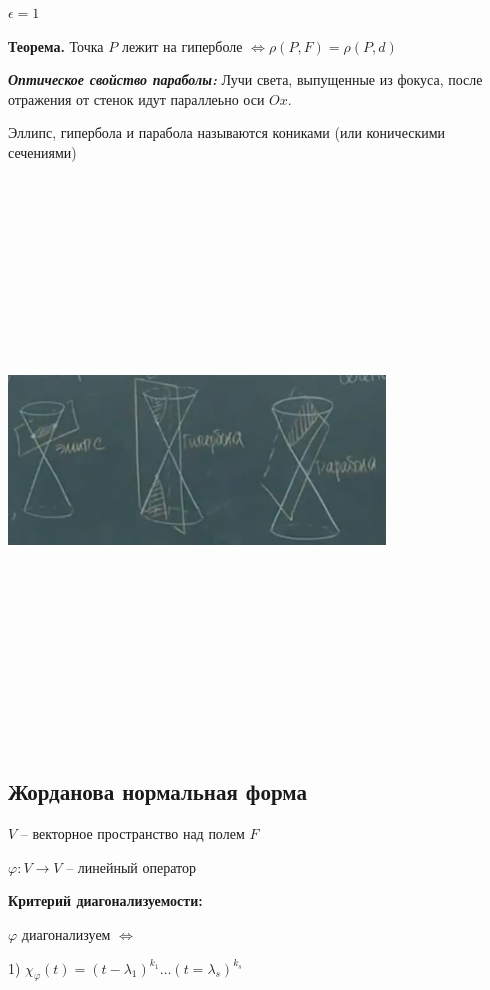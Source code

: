 $\epsilon = 1$

\bigskip
\textbf{Теорема.} Точка $P$ лежит на гиперболе $\Leftrightarrow \rho(P, F) = \rho(P, d)$

\bigskip
\textbf{\textit{Оптическое свойство параболы:}} Лучи света, выпущенные из фокуса, после отражения от стенок идут параллеьно оси $Ox$.

\bigskip
Эллипс, гипербола и парабола называются кониками (или коническими сечениями)

\bigskip
\includegraphics[width=10cm,height=15cm,keepaspectratio]{example6.jpg}

\subsection{Жорданова нормальная форма}

$V$ -- векторное пространство над полем $F$

$\varphi: V \rightarrow V$ -- линейный оператор

\bigskip
\textbf{\textbf{Критерий диагонализуемости:}}

$\varphi$ диагонализуем $\Leftrightarrow$

1) $\chi_{\varphi} (t) = (t - \lambda_1)^{k_1} \dots (t = \lambda_s)^{k_s}$

